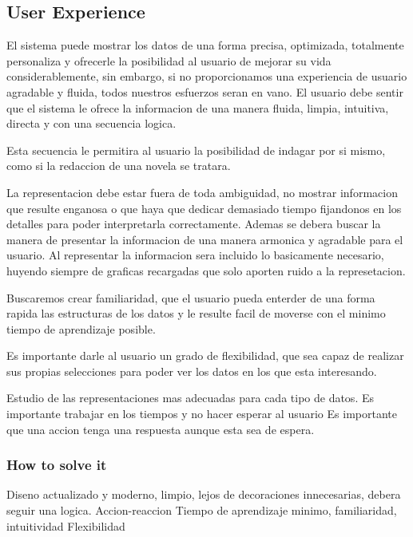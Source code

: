\subsection{User Experience}
 El sistema puede mostrar los datos de una forma precisa, optimizada, totalmente personaliza y ofrecerle
 la posibilidad al usuario de mejorar su vida considerablemente, sin embargo, si no proporcionamos una experiencia
 de usuario agradable y fluida, todos nuestros esfuerzos seran en vano.
 El usuario debe sentir que el sistema le ofrece la informacion de una manera fluida, limpia, intuitiva, directa y con
 una secuencia logica.
  
Esta secuencia le permitira al usuario la posibilidad de indagar por si mismo, como si la redaccion de una novela se tratara.

La representacion debe estar fuera de toda ambiguidad, no mostrar informacion que resulte enganosa o que haya que dedicar demasiado tiempo fijandonos
en los detalles para poder interpretarla correctamente.
Ademas se debera buscar la manera de presentar la informacion de una manera armonica y agradable para el usuario.
Al representar la informacion sera incluido lo basicamente necesario, huyendo siempre de graficas recargadas que solo aporten ruido a la represetacion.

Buscaremos crear familiaridad, que el usuario pueda enterder de una forma rapida las estructuras de los datos y 
le resulte facil de moverse con el minimo tiempo de aprendizaje posible.

Es importante darle al usuario un grado de flexibilidad, que sea capaz de realizar sus propias selecciones para poder ver
los datos en los que esta interesando.

Estudio de las representaciones mas adecuadas para cada tipo de datos.
Es importante trabajar en los tiempos y no hacer esperar al usuario
Es importante que una accion tenga una respuesta aunque esta sea de espera.
    
\subsubsection{How to solve it} 
Diseno actualizado y moderno, limpio, lejos de decoraciones innecesarias, debera seguir una logica.
Accion-reaccion 
Tiempo de aprendizaje minimo, familiaridad, intuitividad
Flexibilidad


